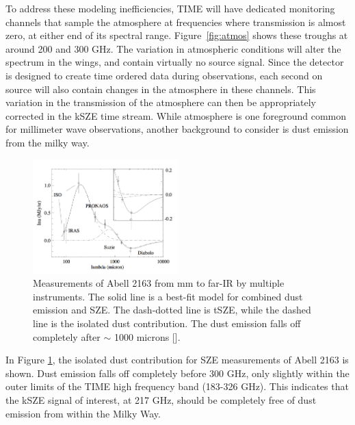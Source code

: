 \documentclass[manuscript]{aastex}
\begin{document}
To address these modeling inefficiencies, TIME will have dedicated monitoring channels that sample the atmosphere at frequencies where transmission is almost zero, at either end of its spectral range. Figure~\ref{fig:atmos} shows these troughs at around 200 and 300 GHz. The variation in atmospheric conditions will alter the spectrum in the wings, and contain virtually no source signal. Since the detector is designed to create time ordered data during observations, each second on source will also contain changes in the atmosphere in these channels. This variation in the transmission of the atmosphere can then be appropriately corrected in the kSZE time stream. 
While atmosphere is one foreground common for millimeter wave observations, another background to consider is dust emission from the milky way. 
\begin{figure}
\vspace{-0.8cm}
  \begin{center}
    \includegraphics[width=0.5\textwidth]{birkinshaw1.png}
   \end{center}
\caption[TIME's frequency window will be mostly free of dust emission contamination. -(\cite{Birkinshaw1999})]{Measurements of Abell 2163 from mm to far-IR by multiple instruments. The solid line is a best-fit model for combined dust emission and SZE. The dash-dotted line is tSZE, while the dashed line is the isolated dust contribution. The dust emission falls off completely after $\sim$ 1000 microns [\cite{Birkinshaw1999}].}
\label{fig:dust}
\end{figure}
In Figure \ref{fig:dust}, the isolated dust contribution for SZE measurements of Abell 2163 is shown. Dust emission falls off completely before 300 GHz, only slightly within the outer limits of the TIME high frequency band (183-326 GHz). This indicates that the kSZE signal of interest, at 217 GHz, should be completely free of dust emission from within the Milky Way. 
\end{document}

